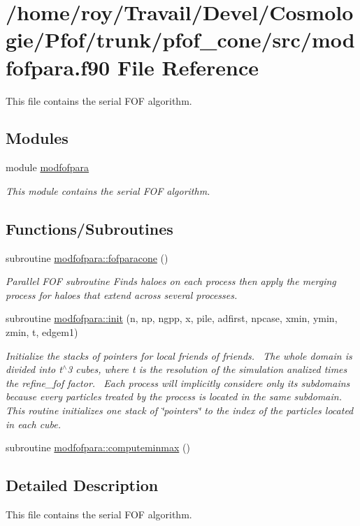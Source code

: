 \hypertarget{modfofpara_8f90}{}\section{/home/roy/\+Travail/\+Devel/\+Cosmologie/\+Pfof/trunk/pfof\+\_\+cone/src/modfofpara.f90 File Reference}
\label{modfofpara_8f90}


This file contains the serial F\+OF algorithm.  


\subsection*{Modules}
\begin{DoxyCompactItemize}
\item 
module \hyperlink{namespacemodfofpara}{modfofpara}
\begin{DoxyCompactList}\small\item\em This module contains the serial F\+OF algorithm. \end{DoxyCompactList}\end{DoxyCompactItemize}
\subsection*{Functions/\+Subroutines}
\begin{DoxyCompactItemize}
\item 
subroutine \hyperlink{namespacemodfofpara_a033a2820dd29f107782b566ca298bde4}{modfofpara\+::fofparacone} ()
\begin{DoxyCompactList}\small\item\em Parallel F\+OF subroutine Finds haloes on each process then apply the merging process for haloes that extend across several processes. \end{DoxyCompactList}\item 
subroutine \hyperlink{namespacemodfofpara_afdd2abc340cad047a13ebbb62f1bafdc}{modfofpara\+::init} (n, np, ngpp, x, pile, adfirst, npcase, xmin, ymin, zmin, t, edgem1)
\begin{DoxyCompactList}\small\item\em Initialize the stacks of pointers for local friends of friends.~\newline
 The whole domain is divided into t$^\wedge$3 cubes, where t is the resolution of the simulation analized times the refine\+\_\+fof factor.~\newline
 Each process will implicitly considere only its subdomains because every particles treated by the process is located in the same subdomain.~\newline
 This routine initializes one stack of \char`\"{}pointers\char`\"{} to the index of the particles located in each cube. \end{DoxyCompactList}\item 
subroutine \hyperlink{namespacemodfofpara_aae8bee067b5066b64d8799e78efa239c}{modfofpara\+::computeminmax} ()
\end{DoxyCompactItemize}


\subsection{Detailed Description}
This file contains the serial F\+OF algorithm. 

